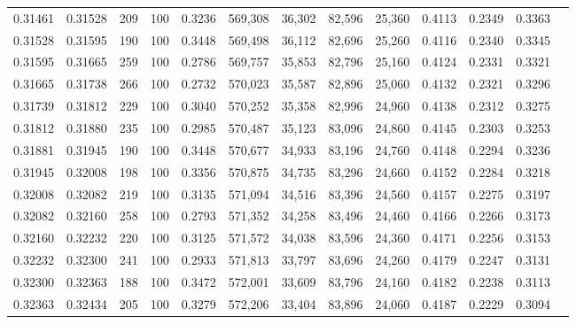 \begin{tabular}{rrrrrrrrrrrrr}
0.31461 & 0.31528 &   209 & 100 &                                     0.3236 & 569,308 &  36,302 &  82,596 &  25,360 & 0.4113 & 0.2349 & 0.3363 \\
0.31528 & 0.31595 &   190 & 100 &                                     0.3448 & 569,498 &  36,112 &  82,696 &  25,260 & 0.4116 & 0.2340 & 0.3345 \\
0.31595 & 0.31665 &   259 & 100 &                                     0.2786 & 569,757 &  35,853 &  82,796 &  25,160 & 0.4124 & 0.2331 & 0.3321 \\
0.31665 & 0.31738 &   266 & 100 &                                     0.2732 & 570,023 &  35,587 &  82,896 &  25,060 & 0.4132 & 0.2321 & 0.3296 \\
0.31739 & 0.31812 &   229 & 100 &                                     0.3040 & 570,252 &  35,358 &  82,996 &  24,960 & 0.4138 & 0.2312 & 0.3275 \\
0.31812 & 0.31880 &   235 & 100 &                                     0.2985 & 570,487 &  35,123 &  83,096 &  24,860 & 0.4145 & 0.2303 & 0.3253 \\
0.31881 & 0.31945 &   190 & 100 &                                     0.3448 & 570,677 &  34,933 &  83,196 &  24,760 & 0.4148 & 0.2294 & 0.3236 \\
0.31945 & 0.32008 &   198 & 100 &                                     0.3356 & 570,875 &  34,735 &  83,296 &  24,660 & 0.4152 & 0.2284 & 0.3218 \\
0.32008 & 0.32082 &   219 & 100 &                                     0.3135 & 571,094 &  34,516 &  83,396 &  24,560 & 0.4157 & 0.2275 & 0.3197 \\
0.32082 & 0.32160 &   258 & 100 &                                     0.2793 & 571,352 &  34,258 &  83,496 &  24,460 & 0.4166 & 0.2266 & 0.3173 \\
0.32160 & 0.32232 &   220 & 100 &                                     0.3125 & 571,572 &  34,038 &  83,596 &  24,360 & 0.4171 & 0.2256 & 0.3153 \\
0.32232 & 0.32300 &   241 & 100 &                                     0.2933 & 571,813 &  33,797 &  83,696 &  24,260 & 0.4179 & 0.2247 & 0.3131 \\
0.32300 & 0.32363 &   188 & 100 &                                     0.3472 & 572,001 &  33,609 &  83,796 &  24,160 & 0.4182 & 0.2238 & 0.3113 \\
0.32363 & 0.32434 &   205 & 100 &                                     0.3279 & 572,206 &  33,404 &  83,896 &  24,060 & 0.4187 & 0.2229 & 0.3094 \\

\end{tabular}
